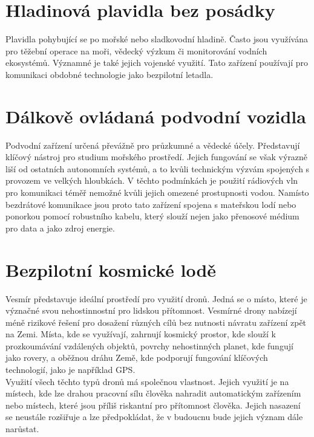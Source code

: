 \documentclass[12pt]{report}
\begin{document}
\section[Hladinová plavidla bez posádky]{Hladinová plavidla bez posádky}
Plavidla pohybující se po mořské nebo sladkovodní hladině. Často jsou využívána pro těžební operace na moři, vědecký výzkum či monitorování vodních ekosystémů. Významné je také jejich vojenské využití. Tato zařízení používají pro komunikaci obdobné technologie jako bezpilotní letadla. \cite{mainbook}

\section[Dálkově ovládaná podvodní vozidla]{Dálkově ovládaná podvodní vozidla}
Podvodní zařízení určená převážně pro průzkumné a vědecké účely. Představují klíčový nástroj pro studium mořského prostředí. Jejich fungování se však výrazně liší od ostatních autonomních systémů, a to kvůli technickým výzvám spojených s provozem ve velkých hloubkách. V těchto podmínkách je použití rádiových vln pro komunikaci téměř nemožné kvůli jejich omezené prostupnosti vodou. Namísto bezdrátové komunikace jsou proto tato zařízení spojena s mateřskou lodí nebo ponorkou pomocí robustního kabelu, který slouží nejen jako přenosové médium pro data a jako zdroj energie. \cite{mainbook}

\section[Bezpilotní kosmické lodě]{Bezpilotní kosmické lodě}
Vesmír představuje ideální prostředí pro využití dronů. Jedná se o místo, které je význačné svou nehostinnostní pro lidskou přítomnost. Vesmírné drony nabízejí méně rizikové řešení pro dosažení různých cílů bez nutnosti návratu zařízení zpět na Zemi. Místa, kde se využívají, zahrnují kosmický prostor, kde slouží k prozkoumávání vzdálených objektů, povrchy nehostinných planet, kde fungují jako rovery, a oběžnou dráhu Země, kde podporují fungování klíčových technologií, jako je například GPS. \cite{mainbook}\\

Využití všech těchto typů dronů má společnou vlastnost. Jejich využití je na místech, kde lze drahou pracovní sílu člověka nahradit automatickým zařízením nebo místech, které jsou příliš riskantní pro přítomnost člověka. Jejich nasazení se neustále rozšiřuje a lze předpokládat, že v budoucnu bude jejich význam dále narůstat.
\end{document}
